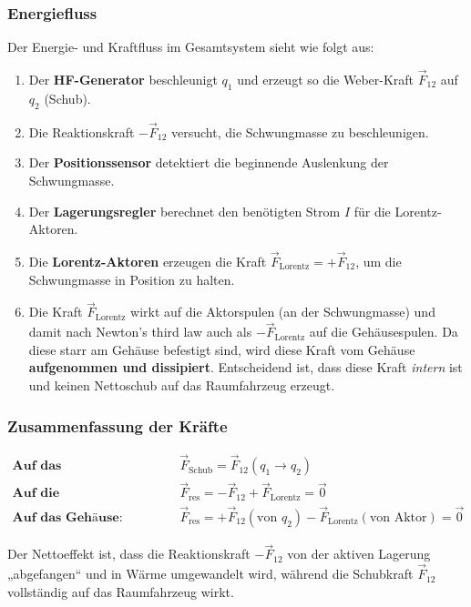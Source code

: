 \documentclass[11pt, a4paper]{article}
\begin{document}
\subsubsection*{Energiefluss}

Der Energie- und Kraftfluss im Gesamtsystem sieht wie folgt aus:

\begin{enumerate}
    \item Der \textbf{HF-Generator} beschleunigt $q_1$ und erzeugt so die Weber-Kraft $\vec{F}_{12}$ auf $q_2$ (Schub).
    \item Die Reaktionskraft $-\vec{F}_{12}$ versucht, die Schwungmasse zu beschleunigen.
    \item Der \textbf{Positionssensor} detektiert die beginnende Auslenkung der Schwungmasse.
    \item Der \textbf{Lagerungsregler} berechnet den benötigten Strom $I$ für die Lorentz-Aktoren.
    \item Die \textbf{Lorentz-Aktoren} erzeugen die Kraft $\vec{F}_\text{Lorentz} = + \vec{F}_{12}$, um die Schwungmasse in Position zu halten.
    \item Die Kraft $\vec{F}_\text{Lorentz}$ wirkt auf die Aktorspulen (an der Schwungmasse) und damit nach Newton's third law auch als $-\vec{F}_\text{Lorentz}$ auf die Gehäusespulen. Da diese starr am Gehäuse befestigt sind, wird diese Kraft vom Gehäuse \textbf{aufgenommen und dissipiert}. Entscheidend ist, dass diese Kraft \textit{intern} ist und keinen Nettoschub auf das Raumfahrzeug erzeugt.
\end{enumerate}

\subsubsection*{Zusammenfassung der Kräfte}

\begin{align*}
\textbf{Auf das Raumfahrzeug:} &\quad \vec{F}_{\text{Schub}} = \vec{F}_{12}(q_1 \rightarrow q_2) \\
\textbf{Auf die Schwungmasse:} &\quad \vec{F}_{\text{res}} = -\vec{F}_{12} + \vec{F}_\text{Lorentz} = \vec{0} \\
\textbf{Auf das Gehäuse:} &\quad \vec{F}_{\text{res}} = +\vec{F}_{12} (\text{von } q_2) - \vec{F}_\text{Lorentz} (\text{von Aktor}) = \vec{0}
\end{align*}

Der Nettoeffekt ist, dass die Reaktionskraft $-\vec{F}_{12}$ von der aktiven Lagerung „abgefangen“ und in Wärme umgewandelt wird, während die Schubkraft $\vec{F}_{12}$
vollständig auf das Raumfahrzeug wirkt.
\end{document}
